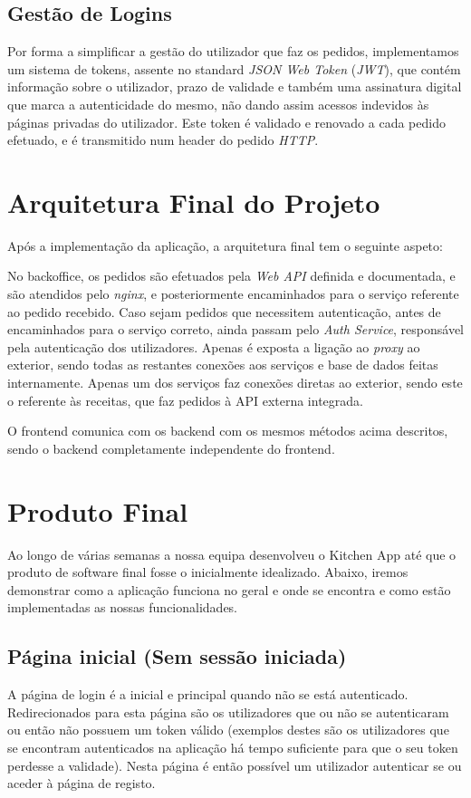 \documentclass[a4paper]{report}
\begin{document}
    \section{Gestão de Logins}
    Por forma a simplificar a gestão do utilizador que faz os pedidos,
    implementamos um sistema de tokens, assente no standard \textit{JSON Web
    Token} (\textit{JWT}), que contém informação sobre o utilizador, prazo de
    validade e também uma assinatura digital que marca a autenticidade do mesmo,
    não dando assim acessos indevidos às páginas privadas do utilizador. Este
    token é validado e renovado a cada pedido efetuado, e é transmitido num
    header do pedido \textit{HTTP}.

\chapter{Arquitetura Final do Projeto}
Após a implementação da aplicação, a arquitetura final tem o seguinte aspeto:

No backoffice, os pedidos são efetuados pela \textit{Web API} definida e
documentada, e são atendidos pelo \textit{nginx}, e posteriormente 
encaminhados para o serviço referente ao pedido recebido. Caso sejam 
pedidos que necessitem autenticação, antes de encaminhados para o serviço 
correto, ainda passam pelo \textit{Auth Service}, responsável pela autenticação 
dos utilizadores. Apenas é exposta a ligação ao \textit{proxy} ao exterior,
sendo todas as restantes conexões aos serviços e base de dados feitas
internamente. Apenas um dos serviços faz conexões diretas ao exterior, sendo
este o referente às receitas, que faz pedidos à API externa integrada.

O frontend comunica com os backend com os mesmos métodos acima descritos,
sendo o backend completamente independente do frontend.

\chapter{Produto Final}

    Ao longo de várias semanas a nossa equipa desenvolveu o Kitchen App até que
    o produto de software final fosse o inicialmente idealizado. Abaixo, iremos
    demonstrar como a aplicação funciona no geral e onde se encontra e como
    estão implementadas as nossas funcionalidades.

    \section{Página inicial (Sem sessão iniciada)}
    A página de login é a inicial e principal quando não se está 
    autenticado. Redirecionados para esta página são os utilizadores que
    ou não se autenticaram ou então não possuem um token válido (exemplos destes 
    são os utilizadores que se encontram autenticados na aplicação há tempo
    suficiente para que o seu token perdesse a validade). Nesta página é 
    então possível um utilizador autenticar se ou aceder à página de registo.
\end{document}
